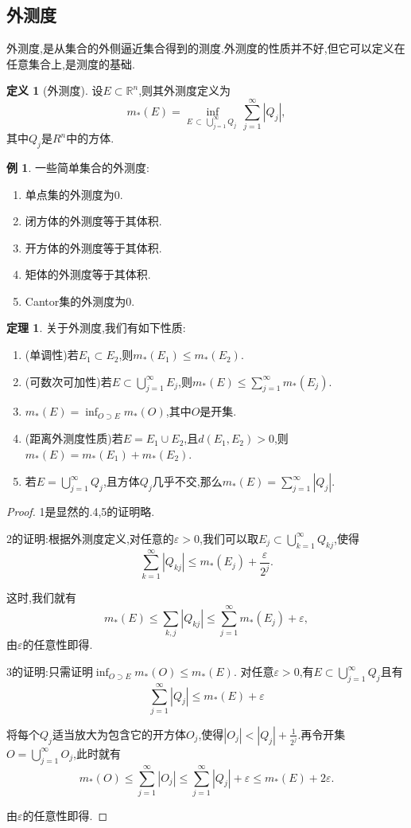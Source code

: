 \documentclass{ctexart}
\theoremstyle{definition}
\newtheorem{definition}{定义}
\newtheorem{theorem}{定理}
\newtheorem{example}{例}
\theoremstyle{remark}
\begin{document}
	\subsection{外测度}
	外测度,是从集合的外侧逼近集合得到的测度.外测度的性质并不好,但它可以定义在任意集合上,是测度的基础.
	
	\begin{definition}[外测度]
		设$E\subset\mathbb{R}^n$,则其外测度定义为
		$$m_*(E)=\inf_{E\,\subset\,\bigcup_{j=1}^\infty{Q_j}\;}{\sum_{j=1}^\infty{|Q_j|}},$$
		其中$Q_j$是$R^n$中的方体.
	\end{definition}
	\begin{example}
		一些简单集合的外测度:
		\begin{enumerate}
			\item 单点集的外测度为0.
			\item 闭方体的外测度等于其体积.
			\item 开方体的外测度等于其体积.
			\item 矩体的外测度等于其体积.
			\item Cantor集的外测度为0.
		\end{enumerate}
	\end{example}
	
	\begin{theorem}
		关于外测度,我们有如下性质:
		\begin{enumerate}
			\item (单调性)若$E_1\subset E_2$,则$m_*(E_1)\le m_*(E_2)$.
			\item (可数次可加性)若$E\subset\bigcup_{j=1}^\infty{E_j}$,则$m_*(E)\le\sum_{j=1}^\infty{m_*(E_j)}$.
			\item $m_*(E)=\inf_{O\supset E}{m_*(O)}$,其中$O$是开集.
			\item (距离外测度性质)若$E=E_1\cup E_2$,且$d(E_1,E_2)>0$,则$m_*(E)=m_*(E_1)+m_*(E_2)$.
			\item 若$E=\bigcup_{j=1}^\infty{Q_j}$,且方体$Q_j$几乎不交,那么$m_*(E)=\sum_{j=1}^\infty{|Q_j|}$.
		\end{enumerate}
	\end{theorem}
	\begin{proof}
		1是显然的.4,5的证明略.
		
		2的证明:根据外测度定义,对任意的$\varepsilon>0$,我们可以取$E_j\subset\bigcup_{k=1}^\infty{Q_{kj}}$,使得
		$$\sum_{k=1}^\infty{|Q_{kj}|}\le m_*(E_j)+\frac{\varepsilon}{2^j}.$$
		
		这时,我们就有
		$$m_*(E)\le\sum_{k,j}{|Q_{kj}|}\le\sum_{j=1}^\infty{m_*(E_j)}+\varepsilon,$$
		由$\varepsilon$的任意性即得.
		
		3的证明:只需证明$\inf_{O\supset E}{m_*(O)}\le m_*(E)$.
		对任意$\varepsilon>0$,有$E\subset\bigcup_{j=1}^\infty{Q_j}$且有
		$$\sum_{j=1}^\infty{|Q_j|}\le m_*(E)+\varepsilon$$
		
		将每个$Q_j$适当放大为包含它的开方体$O_j$,使得$|O_j|<|Q_j|+\frac{1}{2^j}$.再令开集$O=\bigcup_{j=1}^\infty{O_j}$,此时就有
		$$ m_*(O) \le \sum_{j=1}^\infty{|O_j|}
			\le \sum_{j=1}^\infty{|Q_j|}+\varepsilon
			\le m_*(E)+2\varepsilon.$$
		
		由$\varepsilon$的任意性即得.
	\end{proof}
	
\end{document}
